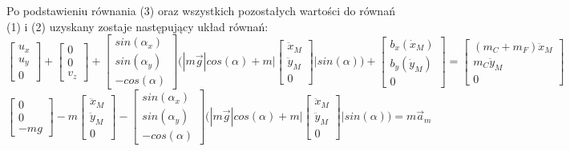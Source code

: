 \documentclass[10pt]{article}
\begin{document}
Po podstawieniu równania (3) oraz wszystkich pozostałych wartości do równań (1) i (2) uzyskany zostaje następujący układ równań:
\begin{equation}
\begin{bmatrix} u_x \\ u_y \\ 0 \end{bmatrix} + 
\begin{bmatrix} 0 \\ 0 \\ v_z \end{bmatrix} +
\begin{bmatrix} sin(\alpha_x) \\ sin(\alpha_y) \\ -cos(\alpha) \end{bmatrix}
\Bigg( |m\vec{g}|cos(\alpha) + m \Bigg| \begin{bmatrix} \ddot{x}_M \\ \ddot{y}_M \\ 0 \end{bmatrix}\Bigg| sin(\alpha) \Bigg) + 
\begin{bmatrix} b_x(\dot{x}_M) \\ b_y(\dot{y}_M) \\ 0 \end{bmatrix} = 
\begin{bmatrix} (m_C + m_F) \ddot{x}_M \\ m_C \ddot{y}_M \\ 0 \end{bmatrix}
\end{equation}
\begin{equation}
\begin{bmatrix} 0 \\ 0 \\ -mg \end{bmatrix} -
m \begin{bmatrix} \ddot{x}_M \\ \ddot{y}_M \\ 0 \end{bmatrix} - 
\begin{bmatrix} sin(\alpha_x) \\ sin(\alpha_y) \\ -cos(\alpha) \end{bmatrix}
\Bigg( |m\vec{g}|cos(\alpha) + m \Bigg| \begin{bmatrix} \ddot{x}_M \\ \ddot{y}_M \\ 0 \end{bmatrix} \Bigg| sin(\alpha) \Bigg)
 = m\vec{a}_m
\end{equation}
\end{document}
